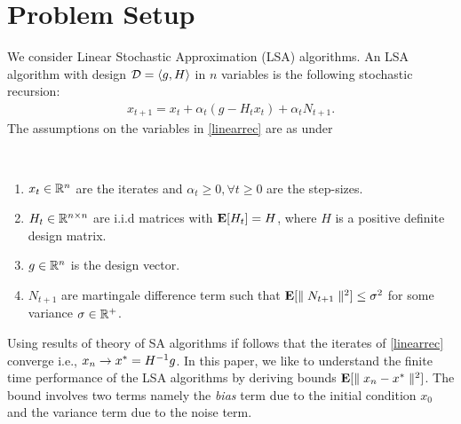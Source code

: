 \section{Problem Setup}
We consider Linear Stochastic Approximation (LSA) algorithms. An LSA algorithm with design $\mathcal{D}=\langle g,H\rangle$ in $n$ variables is the following stochastic recursion:
\begin{align}\label{linearrec}
x_{t+1}=x_t+\alpha_t(g-H_t x_t)+\alpha_t N_{t+1}.
\end{align}
The assumptions on the variables in \eqref{linearrec} are as under
\begin{assumption}\label{lsaassump}
\hspace{10pt}\\
\vspace{-20pt}
\begin{enumerate}[leftmargin=*]
\item $x_t\in \mathbb{R}^n$ are the iterates and $\alpha_t\geq 0 ,\forall t\geq 0$ are the step-sizes.
\item\label{pd} $H_t\in \mathbb{R}^{n\times n}$ are i.i.d matrices with $\mathbf{E}[H_t]=H$, where $H$ is a positive definite design matrix.
\item $g\in \mathbb{R}^n$ is the design vector.
\item $N_{t+1}$ are martingale difference term such that $\mathbf{E}[\parallel N_{t+1} \parallel^2]\leq \sigma^2$ for some variance $\sigma\in \mathbb{R}^+$.
\end{enumerate}
\end{assumption}
Using results of theory of SA algorithms if follows that the iterates of \eqref{linearrec} converge i.e., $x_n\rightarrow x^*=H^{-1}g$. In this paper, we like to understand the finite time performance of the LSA algorithms by deriving bounds $\mathbf{E}[\parallel x_n-x^*\parallel^2]$. The bound involves two terms namely the \emph{bias} term due to the initial condition $x_0$ and the variance term due to the noise term.
\begin{comment}
Note that the LSA in \eqref{linearrec} can be re-written as 
\begin{align}\label{linearrecadd}
x_{t+1}=x_t+\alpha_t(g-H x_t)+\alpha_t M_{t+1},
\end{align}
where $M_{t+1}=N_{t+1}+(H-H_t)x_t$. It is easy to check that when all the entries of $H_t$ are bounded, condition~\ref{mart} of \Cref{saassump} holds for $M_{t+1}$ in \eqref{linearrecadd}.
\end{comment}